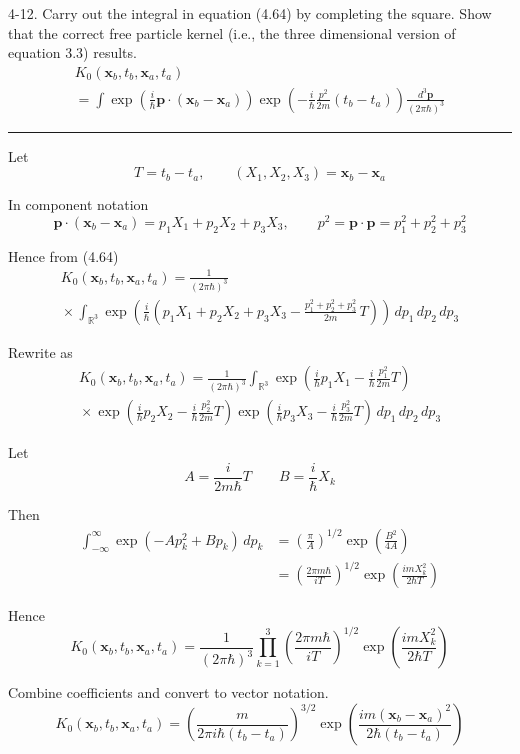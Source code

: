 \documentclass[12pt]{article}
\newcommand\INT{\int_{\mathbb R^3}}
\begin{document}
4-12.
Carry out the integral in equation (4.64) by completing the square.
Show that the correct free particle kernel
(i.e., the three dimensional version of equation 3.3) results.
\begin{multline*}
K_0(\mathbf x_b,t_b,\mathbf x_a,t_a)
\\
=\int
\exp\left(\frac{i}{\hbar}\mathbf p\cdot(\mathbf x_b-\mathbf x_a)\right)
\exp\left(-\frac{i}{\hbar}\frac{p^2}{2m}(t_b-t_a)\right)
\frac{d^3\mathbf p}{(2\pi\hbar)^3}
\tag{4.64}
\end{multline*}

\bigskip
\hrule

\bigskip
Let
\begin{equation*}
T=t_b-t_a,
\qquad
(X_1,X_2,X_3)=\mathbf x_b-\mathbf x_a
\end{equation*}

In component notation
\begin{equation*}
\mathbf p\cdot(\mathbf x_b-\mathbf x_a)=p_1X_1+p_2X_2+p_3X_3,
\qquad
p^2=\mathbf p\cdot\mathbf p=p_1^2+p_2^2+p_3^2
\end{equation*}

Hence from (4.64)
\begin{multline*}
K_0(\mathbf x_b,t_b,\mathbf x_a,t_a)=\frac{1}{(2\pi\hbar)^3}
\\
{}\times\INT
\exp\left(\frac{i}{\hbar}\left(
p_1X_1+p_2X_2+p_3X_3-\frac{p_1^2+p_2^2+p_3^2}{2m}\,T
\right)\right)
\,dp_1\,dp_2\,dp_3
\end{multline*}

Rewrite as
\begin{multline*}
K_0(\mathbf x_b,t_b,\mathbf x_a,t_a)=\frac{1}{(2\pi\hbar)^3}\INT
\exp\left(\frac{i}{\hbar}p_1X_1-\frac{i}{\hbar}\frac{p_1^2}{2m}T\right)
\\
{}\times
\exp\left(\frac{i}{\hbar}p_2X_2-\frac{i}{\hbar}\frac{p_2^2}{2m}T\right)
\exp\left(\frac{i}{\hbar}p_3X_3-\frac{i}{\hbar}\frac{p_3^2}{2m}T\right)
\,dp_1\,dp_2\,dp_3
\end{multline*}

Let
\begin{equation*}
A=\frac{i}{2m\hbar}T
\qquad
B=\frac{i}{\hbar}X_k
\end{equation*}

Then
\begin{align*}
\int_{-\infty}^\infty\exp(-Ap_k^2+Bp_k)\,dp_k
&=\left(\frac{\pi}{A}\right)^{1/2}\exp\left(\frac{B^2}{4A}\right)
\\
&=\left(\frac{2\pi m\hbar}{iT}\right)^{1/2}
\exp\left(\frac{imX_k^2}{2\hbar T}\right)
\tag{1}
\end{align*}

Hence
\begin{equation*}
K_0(\mathbf x_b,t_b,\mathbf x_a,t_a)=
\frac{1}{(2\pi\hbar)^3}
\prod_{k=1}^3
\left(\frac{2\pi m\hbar}{iT}\right)^{1/2}
\exp\left(\frac{imX_k^2}{2\hbar T}\right)
\end{equation*}

Combine coefficients and convert to vector notation.
\begin{equation*}
K_0(\mathbf x_b,t_b,\mathbf x_a,t_a)=
\left(\frac{m}{2\pi i\hbar(t_b-t_a)}\right)^{3/2}
\exp\left(\frac{im(\mathbf x_b-\mathbf x_a)^2}{2\hbar(t_b-t_a)}\right)
\tag{2}
\end{equation*}
\end{document}
